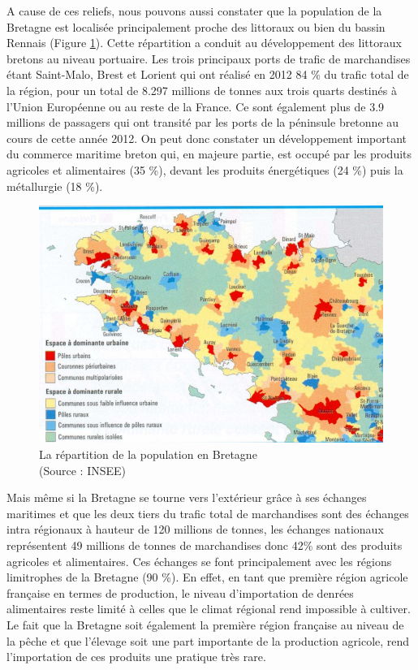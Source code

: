 \documentclass[a4paper,12pt]{report}
\begin{document}
			A cause de ces reliefs, nous pouvons aussi constater que la population de la Bretagne est localisée principalement proche des littoraux ou bien du bassin Rennais (Figure \ref{DensitePopulationBretagne}). Cette répartition a conduit au développement des littoraux bretons au niveau portuaire. Les trois principaux ports de trafic de marchandises étant Saint-Malo, Brest et Lorient qui ont réalisé en 2012 84 \% du trafic total de la région, pour un total de 8.297 millions de tonnes aux trois quarts destinés à l’Union Européenne ou au reste de la France. Ce sont également plus de 3.9 millions de passagers qui ont transité par les ports de la péninsule bretonne au cours de cette année 2012\cite{CommerceMaritimeBretagne}. On peut donc constater un développement important du commerce maritime breton qui, en majeure partie, est occupé par les produits agricoles et alimentaires (35 \%), devant les produits énergétiques (24 \%) puis la métallurgie (18 \%).
			
			\begin{figure}[!h]
			\centering
			\includegraphics[scale=3.25]{Illustrations/DensitePopulationBretagne.jpg}
			\caption{La répartition de la population en Bretagne\\(Source : INSEE)}
			\label{DensitePopulationBretagne}
			\end{figure}						
			
			Mais même si la Bretagne se tourne vers l’extérieur grâce à ses échanges maritimes et que les deux tiers du trafic total de marchandises sont des échanges intra régionaux à hauteur de 120 millions de tonnes, les échanges nationaux représentent 49 millions de tonnes de marchandises donc 42\% sont des produits agricoles et alimentaires\cite{InfrastructureConnecterBretagneMondeCCI}. Ces échanges se font principalement avec les régions limitrophes de la Bretagne (90 \%). En effet, en tant que première région agricole française en termes de production, le niveau d’importation de denrées alimentaires reste limité à celles que le climat régional rend impossible à cultiver. Le fait que la Bretagne soit également la première région française au niveau de la pêche et que l’élevage soit une part importante de la production agricole, rend l’importation de ces produits une pratique très rare.
			
\end{document}

